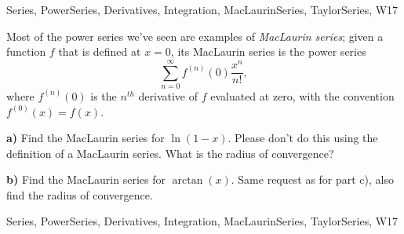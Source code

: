 \begin{tagblock}{Series, PowerSeries, Derivatives, Integration, MacLaurinSeries, TaylorSeries, W17}
\begin{question}

Most of the power series we've seen are examples of \textit{MacLaurin series}; given a function $f$ that is defined at $x=0$, its MacLaurin series is the power series
\begin{equation}\label{mac}
\sum_{n=0}^{\infty}f^{(n)}(0)\frac{x^n}{n!},
\end{equation}
where $f^{(n)}(0)$ is the $n^{th}$ derivative of $f$ evaluated at zero, with the convention $f^{(0)}(x)=f(x)$. 

\bigskip

\textbf{a)} Find the MacLaurin series for $\ln(1-x)$. Please don't do this using the definition of a MacLaurin series. What is the radius of convergence? 

\bigskip

\textbf{b)} Find the MacLaurin series for $\arctan(x)$. Same request as for part c), also find the radius of convergence.
	
	
\begin{tags}
	    Series, PowerSeries, Derivatives, Integration, MacLaurinSeries, TaylorSeries, W17
\end{tags}
	
\begin{diary}
	    
\end{diary}
	
\begin{solution}
	   
\end{solution}
	
\end{question}

\end{tagblock}

 

